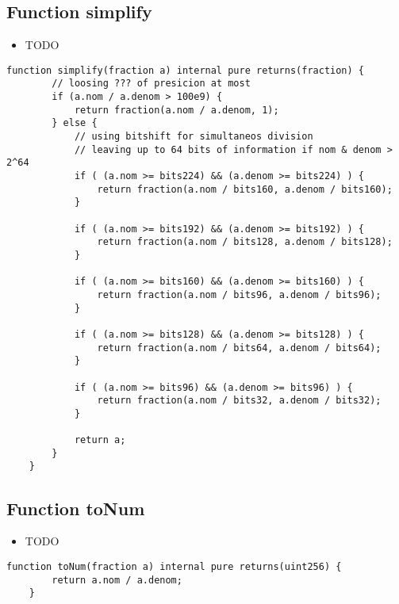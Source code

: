 \subsection{Function simplify}

\noindent\begin{itemize}
\item TODO
\end{itemize}

\begin{lstlisting}[firstnumber=69]
    function simplify(fraction a) internal pure returns(fraction) {
        // loosing ??? of presicion at most
        if (a.nom / a.denom > 100e9) {
            return fraction(a.nom / a.denom, 1);
        } else {
            // using bitshift for simultaneos division
            // leaving up to 64 bits of information if nom & denom > 2^64
            if ( (a.nom >= bits224) && (a.denom >= bits224) ) {
                return fraction(a.nom / bits160, a.denom / bits160);
            }

            if ( (a.nom >= bits192) && (a.denom >= bits192) ) {
                return fraction(a.nom / bits128, a.denom / bits128);
            }

            if ( (a.nom >= bits160) && (a.denom >= bits160) ) {
                return fraction(a.nom / bits96, a.denom / bits96);
            }

            if ( (a.nom >= bits128) && (a.denom >= bits128) ) {
                return fraction(a.nom / bits64, a.denom / bits64);
            }

            if ( (a.nom >= bits96) && (a.denom >= bits96) ) {
                return fraction(a.nom / bits32, a.denom / bits32);
            }

            return a;
        }
    }
\end{lstlisting}

\subsection{Function toNum}

\noindent\begin{itemize}
\item TODO
\end{itemize}

\begin{lstlisting}[firstnumber=49]
    function toNum(fraction a) internal pure returns(uint256) {
        return a.nom / a.denom;
    }
\end{lstlisting}
